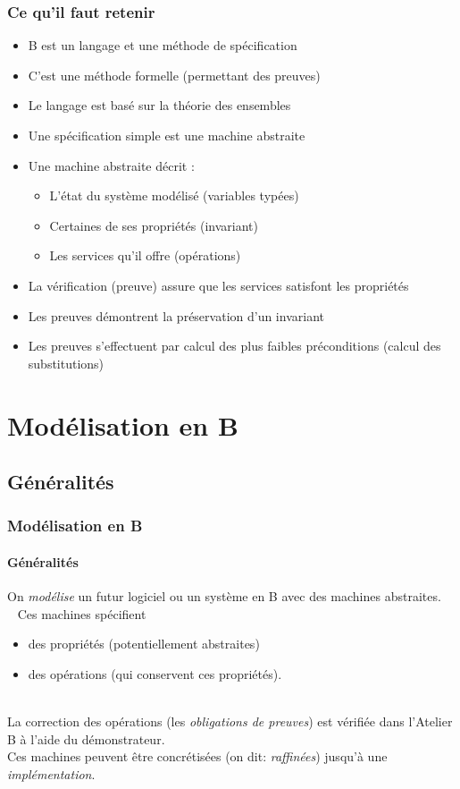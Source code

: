 \documentclass[11pt,a4paper,xcolor=table]{beamer} %
\begin{document}
\begin{frame}
\frametitle{Ce qu'il faut retenir}
\begin{itemize}
\item B est un langage et une méthode de spécification
\item C'est une méthode formelle (permettant des preuves)
\item Le langage est basé sur la théorie des ensembles
\item Une spécification simple est une machine abstraite
\item Une machine abstraite décrit :
\begin{itemize}
\item L'état du système modélisé (variables typées)
\item Certaines de ses propriétés (invariant)
\item Les services qu'il offre (opérations)
\end{itemize}
\item La vérification (preuve) assure que les services satisfont les
propriétés
\item Les preuves démontrent la préservation d'un invariant
\item Les preuves s'effectuent par calcul des plus faibles préconditions
(calcul des substitutions)
\end{itemize}
\end{frame}

\section{Modélisation en B}
\subsection{Généralités}
\begin{frame}
\frametitle{Modélisation en B}
\framesubtitle{Généralités}
On \emph{modélise} un futur logiciel ou un système en B avec des machines abstraites.\\[5pt]~\pause
Ces machines spécifient\pause
\begin{itemize}
\item des propriétés (potentiellement abstraites)
\pause
\item des opérations (qui conservent ces propriétés).
\pause
\end{itemize}
~\\[0pt]
La correction des opérations (les \emph{obligations de preuves}) est vérifiée dans l'Atelier B à l'aide du démonstrateur.\pause\\[5pt]
Ces machines peuvent être concrétisées (on dit: \emph{raffinées}) jusqu'à une \emph{implémentation}.
\end{frame}
\end{document}
